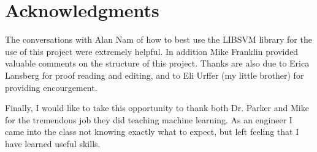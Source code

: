 \section*{Acknowledgments}
The conversations with Alan Nam of how to best use the LIBSVM library for the use of this project were extremely helpful.
In addition Mike Franklin provided valuable comments on the structure of this project.
Thanks are also due to Erica Lansberg for proof reading and editing, and to Eli Urffer (my little brother) for providing encourgement.

Finally, I would like to take this opportunity to thank both Dr. Parker and Mike for the tremendous job they did teaching machine learning.
As an engineer I came into the class not knowing exactly what to expect, but left feeling that I have learned useful skills.


